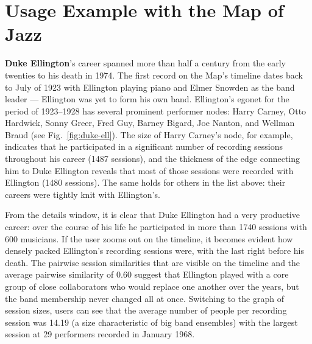 \documentclass[12pt]{cmuthesis}
\begin{document}

\section{Usage Example with the Map of Jazz}

  \textbf{Duke Ellington}'s career spanned more than half a century from the
  early twenties to his death in 1974. The first record on the Map's timeline
  dates back to July of 1923 with Ellington playing piano and Elmer Snowden as the
  band leader --- Ellington was yet to form his own band. Ellington's egonet for
  the period of 1923--1928 has several prominent performer nodes: Harry Carney,
  Otto Hardwick, Sonny Greer, Fred Guy,  Barney Bigard, Joe Nanton, and Wellman
  Braud (see Fig.~\ref{fig:duke-ell}). The size of Harry Carney's node, for
  example, indicates that he participated in a significant number of recording
  sessions throughout his career (1487 sessions), and the thickness of the edge
  connecting him to Duke Ellington reveals that most of those sessions were
  recorded with Ellington (1480 sessions). The same holds for others in the list
  above: their careers were tightly knit with Ellington's.


  From the details window, it is clear that Duke Ellington had a very productive
  career: over the course of his life he participated in more than 1740 sessions
  with 600 musicians. If the user zooms out on the timeline, it becomes evident
  how densely packed Ellington's recording sessions were, with the last
  right before his death. The pairwise session similarities that are visible on
  the timeline and the average pairwise similarity of 0.60 suggest that Ellington
  played with a core group of close collaborators who would replace one another
  over the years, but the band membership never changed all at once. Switching to
  the graph of session sizes, users can see that the average number of people per
  recording session was 14.19 (a size characteristic of big band ensembles) with
  the largest session at 29 performers recorded in January 1968.
\end{document}
